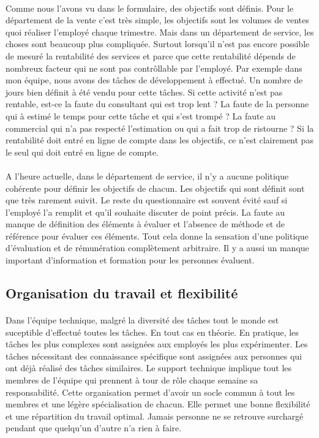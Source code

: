 \paragraph{}Comme nous l'avons vu dans le formulaire, des objectifs sont définis. Pour le département de la vente c'est très simple, les objectifs sont les volumes de ventes quoi réaliser l'employé chaque trimestre. Mais dans un département de service, les choses sont beaucoup plus compliquée. Surtout lorsqu'il n'est pas encore possible de mesuré la rentabilité des services et parce que cette rentabilité dépends de nombreux facteur qui ne sont pas contrôllable par l'employé. Par exemple dans mon équipe, nous avons des tâches de développement à effectué. Un nombre de jours bien définit à été vendu pour cette tâches. Si cette activité n'est pas rentable, est-ce la faute du consultant qui est trop lent ? La faute de la personne qui à estimé le temps pour cette tâche et qui s'est trompé ? La faute au commercial qui n'a pas respecté l'estimation ou qui a fait trop de ristourne ? Si la rentabilité doit entré en ligne de compte dans les objectifs, ce n'est clairement pas le seul qui doit entré en ligne de compte. 

\paragraph{}A l'heure actuelle, dans le département de service, il n'y a aucune politique cohérente pour définir les objectifs de chacun. Les objectifs qui sont définit sont que très rarement suivit. Le reste du questionnaire est souvent évité sauf si l'employé l'a remplit et qu'il souhaite discuter de point précis. La faute au manque de définition des éléments à évaluer et l'absence de méthode et de référence pour évaluer ces éléments. Tout cela donne la sensation d'une politique d'évaluation et de rémunération complètement arbitraire. Il y a aussi un manque important d'information et formation pour les personnes évaluent.



 


\subsection{Organisation du travail et flexibilité}
\paragraph*{} Dans l'équipe technique, malgré la diversité des tâches tout le monde est suceptible d'effectué toutes les tâches. En tout cas en théorie. En pratique, les tâches les plus complexes sont assignées aux employés les plus expérimenter. Les tâches nécessitant des connaissance spécifique sont assignées aux personnes qui ont déjà réalisé des tâches similaires. Le support technique implique tout les membres de l'équipe qui prennent à tour de rôle chaque semaine sa responsabilité. Cette organisation permet d'avoir un socle commun à tout les membres et une légère spécialisation de chacun. Elle permet une bonne flexibilité et une répartition du travail optimal. Jamais personne ne se retrouve surchargé pendant que quelqu'un d'autre n'a rien à faire. 

